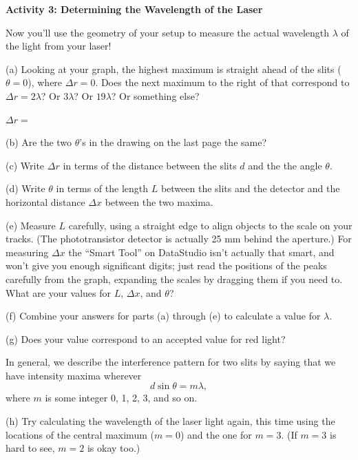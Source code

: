 \pagebreak[2]
\textbf{Activity 3: Determining the Wavelength of the Laser }

Now you'll use the geometry of your setup to measure the actual wavelength $\lambda$ of the light from your laser!

(a) Looking at your graph, the highest maximum is straight ahead of the slits ($\theta=0$), where $\Delta r=0$.  Does the next maximum to the right of that correspond to $\Delta r=2\lambda$?  Or $3\lambda$?  Or $19\lambda$?  Or something else?

\vspace{0.1in}
\hspace{0.8in}$\Delta r=$
\vspace{0.1in}

(b) Are the two $\theta$'s in the drawing on the last page the same?
\answerspace{0.3in}

(c) Write $\Delta r$ in terms of the distance between the slits $d$ and the the angle $\theta$.
\answerspace{0.5in}

(d) Write $\theta$ in terms of the length $L$ between the slits and the detector and the horizontal distance $\Delta x$ between the two maxima.
\answerspace{0.5in}

(e) Measure $L$ carefully, using a straight edge to align objects to the scale on your tracks.  (The phototransistor detector is actually 25 mm behind the aperture.)  For measuring $\Delta x$ the ``Smart Tool'' on DataStudio isn't actually that smart, and won't give you enough significant digits; just read the positions of the peaks carefully from the graph, expanding the scales by dragging them if you need to.  What are your values for $L$, $\Delta x$, and $\theta$?
\answerspace{0.8in}

(f) Combine your answers for parts (a) through (e) to calculate a value for $\lambda$.  
\answerspace{1in}

(g) Does your value correspond to an accepted value for red light?
\answerspace{0.3in}

In general, we describe the interference pattern for two slits by saying that we have intensity maxima wherever 
\begin{displaymath}
d \sin \theta = m \lambda,
\end{displaymath}
where $m$ is some integer 0, 1, 2, 3, and so on.  

(h) Try calculating the wavelength of the laser light again, this time using the locations of the central maximum ($m=0$) and the one for $m=3$.  (If $m=3$ is hard to see, $m=2$ is okay too.)
\answerspace{1.0in}



